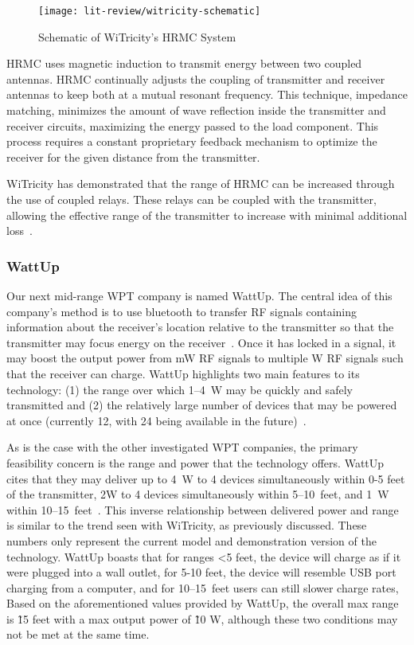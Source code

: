 \begin{figure}[t]
\centering
\texttt{[image: lit-review/witricity-schematic]}
    \caption[WiTricity schematic]{Schematic of WiTricity's HRMC System~\cite{kesler_highly_2013}}
    \label{fig:lit-review-witricity-schematic}
\end{figure}

HRMC uses magnetic induction to transmit energy between two coupled antennas. HRMC continually adjusts the coupling of transmitter and receiver antennas to keep both at a mutual resonant frequency. This technique, impedance matching, minimizes the amount of wave reflection inside the transmitter and receiver circuits, maximizing the energy passed to the load component. This process requires a constant proprietary feedback mechanism to optimize the receiver for the given distance from the transmitter.

WiTricity has demonstrated that the range of HRMC can be increased through the use of coupled relays. These relays can be coupled with the transmitter, allowing the effective range of the transmitter to increase with minimal additional loss~\cite{butler_tour_2013}.

\subsubsection{WattUp}
Our next mid-range WPT company is named WattUp. The central idea of this company's method is to use bluetooth to transfer RF signals containing information about the receiver's location relative to the transmitter so that the transmitter may focus energy on the receiver~\cite{energouscorporation2016}. Once it has locked in a signal, it may boost the output power from mW RF signals to multiple W RF signals such that the receiver can charge. WattUp highlights two main features to its technology: (1) the range over which \numrange{1}{4}~W may be quickly and safely transmitted and (2) the relatively large number of devices that may be powered at once (currently 12, with 24 being available in the future)~\cite{energouscorporation2016}.

As is the case with the other investigated WPT companies, the primary feasibility concern is the range and power that the technology offers. WattUp cites that they may deliver up to 4~W to 4 devices simultaneously within 0-5 feet of the transmitter, 2W to 4 devices simultaneously within \numrange{5}{10}~feet, and 1~W within \numrange{10}{15}~feet~\cite{energouscorporation2016}. This inverse relationship between delivered power and range is similar to the trend seen with WiTricity, as previously discussed. These numbers only represent the current model and demonstration version of the technology. WattUp boasts that for ranges <5 feet, the device will charge as if it were plugged into a wall outlet, for 5-10 feet, the device will resemble USB port charging from a computer, and for \numrange{10}{15}~feet users can still slower charge rates, Based on the aforementioned values provided by WattUp, the overall max range is \~15 feet with a max output power of \~10 W, although these two conditions may not be met at the same time.

